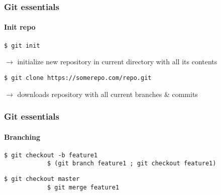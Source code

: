 \documentclass{beamer}
\begin{document}
    \begin{frame}[fragile]
        \frametitle{Git essentials}
        \framesubtitle{Init repo}
        \begin{lstlisting}[gobble=12]
            $ git init
        \end{lstlisting}
        $\rightarrow$ initialize new repository in current directory with all its contents
        \begin{lstlisting}[gobble=12]
            $ git clone https://somerepo.com/repo.git
        \end{lstlisting}
        $\rightarrow$ downloads repository with all current branches \& commits
    \end{frame}
    \begin{frame}[fragile]
        \frametitle{Git essentials}
        \framesubtitle{Branching}
        \begin{lstlisting}[gobble=12]
            $ git checkout -b feature1
            $ (git branch feature1 ; git checkout feature1)
        \end{lstlisting}
        \begin{lstlisting}[gobble=12]
            $ git checkout master
            $ git merge feature1
        \end{lstlisting}

    \end{frame}
\end{document}

